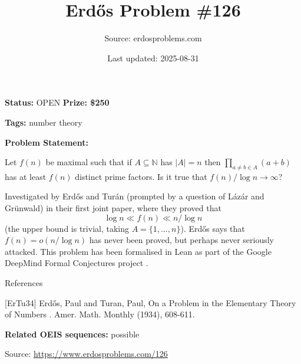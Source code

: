 \documentclass{article}
\title{Erd\H{o}s Problem \#126}
\date{Last updated: 2025-08-31}
\author{Source: erdosproblems.com}
\begin{document}
\maketitle

\noindent\textbf{Status:} OPEN \quad \textbf{Prize: \$250}

\noindent\textbf{Tags:} number theory

\medskip

\noindent\textbf{Problem Statement:}

Let $f(n)$ be maximal such that if $A\subseteq\mathbb{N}$ has $\lvert A\rvert=n$ then $\prod_{a\neq b\in A}(a+b)$ has at least $f(n)$ distinct prime factors. Is it true that $f(n)/\log n\to\infty$?




Investigated by Erd\H{o}s and Tur\'{a}n \cite{ErTu34} (prompted by a question of L\'{a}z\'{a}r and Gr\"{u}nwald) in their first joint paper, where they proved that\[\log n \ll f(n) \ll n/\log n\](the upper bound is trivial, taking $A=\{1,\ldots,n\}$). Erd\H{o}s says that $f(n)=o(n/\log n)$ has never been proved, but perhaps never seriously attacked. This problem has been formalised in Lean as part of the Google DeepMind Formal Conjectures project .




References

[ErTu34] Erd\H{o}s, Paul and Turan, Paul, On a Problem in the Elementary Theory of Numbers . Amer. Math. Monthly (1934), 608-611.

\noindent\textbf{Related OEIS sequences:} possible


\bigskip
\noindent\small{Source: \url{https://www.erdosproblems.com/126}}
\end{document}
